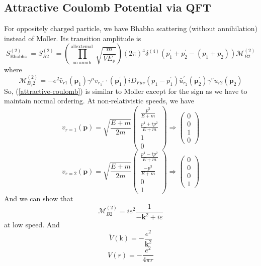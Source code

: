 \subsection{Attractive Coulomb Potential via QFT}
For oppositely charged particle, we have Bhabha scattering (without annihilation) instead of Moller. Its transition amplitude is
\begin{equation}S_{\text {Bhabha }}^{(2)}=S_{B 2}^{(2)}=\left(\prod_{\text {no annih }}^{\text {allextemal }} \sqrt{\frac{m}{V E_{\mathrm{p}}}}\right)(2 \pi)^{4} \delta^{(4)}\left(p_{1}^{\prime}+p_{2}^{\prime}-\left(p_{1}+p_{2}\right)\right) \mathcal{M}_{B 2}^{(2)}
\label{attractive-coulomb}
\end{equation}
where
\begin{equation}\mathcal{M}_{B_{2} 2}^{(2)}=-e^{2} \bar{v}_{r1}\left(\mathbf{p}_{1}\right) \gamma^{\mu} v_{r_1'} \cdot\left(\mathbf{p}_{1}^{\prime}\right) i D_{F \mu \nu}\left(p_{1}-p_{1}^{\prime}\right) \bar{u}_{r_{2}}^{\prime}\left(\mathbf{p}_{2}^{\prime}\right) \gamma^{v} u_{r2}\left(\mathbf{p}_{2}\right)\end{equation}
So, (\ref{attractive-coulomb}) is similar to Moller except for the sign as we have to maintain normal ordering. At non-relativistic speeds, we have
$$v_{r=1}(\mathbf{p})=\sqrt{\frac{E+m}{2 m}}\left(\begin{array}{c}
\frac{p^{3}}{E+m} \\
\frac{p^{1}+i p^{2}}{E+m} \\
1 \\
0
\end{array}\right) \Rightarrow\left(\begin{array}{l}
0 \\
0 \\
1 \\
0
\end{array}\right)$$
$$v_{r=2}(\mathbf{p})=\sqrt{\frac{E+m}{2 m}}\left(\begin{array}{c}
\frac{p^{1}-i p^{2}}{E+m} \\
\frac{-p^{3}}{E+m} \\
0 \\
1
\end{array}\right) \Rightarrow\left(\begin{array}{l}
0 \\
0 \\
0 \\
1
\end{array}\right)$$
And we can show that 
\begin{equation}\mathcal{M}_{B 2}^{(2)}=i e^{2} \frac{1}{-\mathbf{k}^{2}+i \varepsilon}\end{equation}
at low speed. And
\begin{equation}\tilde{V}(\mathrm{k})=-\frac{e^{2}}{\mathbf{k}^{2}}\end{equation}
\begin{equation}V(r)=-\frac{e^{2}}{4 \pi r}\end{equation}